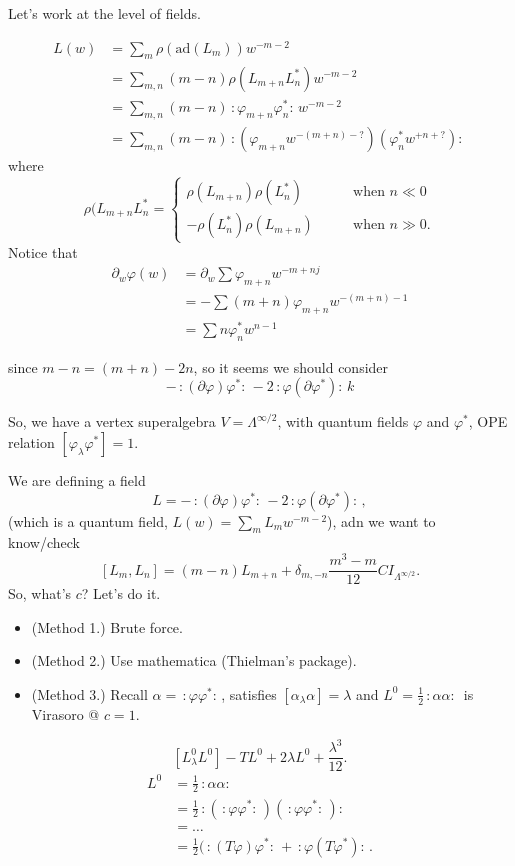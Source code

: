 \medskip\noindent
Let's work at the level of fields.

\begin{align*}
L(w)&=\sum_m \rho(\text{ad}(L_m)) w^{-m-2}\\
&=\sum_{m,n}(m-n)\rho(L_{m+n}L_n^*)w^{-m-2}\\
&=\sum_{m,n}(m-n)\,:\!\varphi_{m+n}\varphi^*_n\!:\,w^{-m-2}\\
&=\sum_{m,n}(m-n)\,:\!(\varphi_{m+n}w^{-(m+n)-?})
(\varphi_n^*w^{+n+?})\!:\,
\end{align*}
where
$$
\rho(L_{m+n}L_n^* =\begin{cases}
\rho(L_{m+n})\rho(L_n^*)\qquad &\text{when $n\ll 0$} \\
-\rho(L^*_n)\rho(L_{m+n})\qquad &\text{when }n\gg 0.
\end{cases}
$$
Notice that
\begin{align*}
\partial_w\varphi(w)&=\partial_w \sum \varphi_{m+n}w^{-m+nj}\\
&=-\sum(m+n)\varphi_{m+n}w^{-(m+n)-1}\\
&=\sum n \varphi_n^* w^{n-1}
\end{align*}

\noindent
since $m-n=(m+n)-2n$,
so it seems we should consider
$$
-\,:\!(\partial \varphi)\varphi^*\!:\,
-2\,:\!\varphi(\partial \varphi^*)\!:\,k
$$

\medskip\noindent
So, we have a vertex superalgebra
$V=\Lambda^{\infty/2}$, with quantum fields
$\varphi$ and $\varphi^*$, OPE relation
$[\varphi_\lambda \varphi^*]=1$.

We are defining a field
$$
L=-\,:\!(\partial \varphi)\varphi^*:\,
-2\,:\!\varphi(\partial \varphi^*)\!:\,,
$$
(which is a quantum field, $L(w)=\sum_m L_mw^{-m-2}$),
adn we want to know/check
$$
[L_m,L_n]=(m-n)L_{m+n}+\delta_{m,-n}\frac{m^3-m}{12}CI_{\Lambda^{\infty/2}}.
$$
So, what's $c$? Let's do it.

\begin{itemize}
\item (Method 1.) Brute force.
\item (Method 2.) Use mathematica (Thielman's package).
\item (Method 3.) Recall $\alpha=\,:\!\varphi \varphi^*\!:\,$,
satisfies $[\alpha_\lambda \alpha]=\lambda$ and
$L^0=\frac{1}{2}\,:\!\alpha \alpha\!:\,$
is Virasoro @ $c=1$.
\end{itemize}
$$
[L^0_\lambda L^0]-TL^0+2\lambda L^0+\frac{\lambda^3}{12}.
$$
\begin{align*}
L^0&=\frac{1}{2}\,:\!\alpha \alpha\!:\,\\
&=\frac{1}{2}
\,:\!(\,:\!\varphi \varphi^*\!:\,)(\,:\!\varphi \varphi^*\!:\,)\!:\,\\
&=\ldots\\
&=\frac{1}{2}(\,:\!(T\varphi)\varphi^*\!:\,+\,:\!\varphi(T\varphi^*)\!:\,.
\end{align*}

